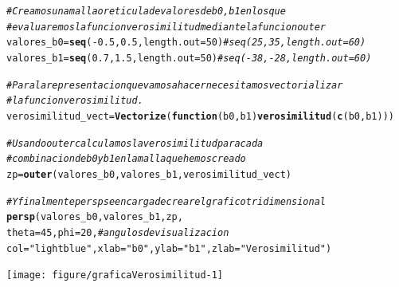 \documentclass[10pt,a4paper]{article}\usepackage[]{graphicx}\usepackage[]{color}
\makeatletter
\newcommand{\hlnum}[1]{\textcolor[rgb]{0.686,0.059,0.569}{#1}}%
\newcommand{\hlstr}[1]{\textcolor[rgb]{0.192,0.494,0.8}{#1}}%
\newcommand{\hlcom}[1]{\textcolor[rgb]{0.678,0.584,0.686}{\textit{#1}}}%
\newcommand{\hlopt}[1]{\textcolor[rgb]{0,0,0}{#1}}%
\newcommand{\hlstd}[1]{\textcolor[rgb]{0.345,0.345,0.345}{#1}}%
\newcommand{\hlkwa}[1]{\textcolor[rgb]{0.161,0.373,0.58}{\textbf{#1}}}%
\newcommand{\hlkwb}[1]{\textcolor[rgb]{0.69,0.353,0.396}{#1}}%
\newcommand{\hlkwc}[1]{\textcolor[rgb]{0.333,0.667,0.333}{#1}}%
\newcommand{\hlkwd}[1]{\textcolor[rgb]{0.737,0.353,0.396}{\textbf{#1}}}%
\newenvironment{kframe}{%
 \def\at@end@of@kframe{}%
 \ifinner\ifhmode%
  \def\at@end@of@kframe{\end{minipage}}%
  \begin{minipage}{\columnwidth}%
 \fi\fi%
 \def\FrameCommand##1{\hskip\@totalleftmargin \hskip-\fboxsep
 \colorbox{shadecolor}{##1}\hskip-\fboxsep
     \hskip-\linewidth \hskip-\@totalleftmargin \hskip\columnwidth}%
 \MakeFramed {\advance\hsize-\width
   \@totalleftmargin\z@ \linewidth\hsize
   \@setminipage}}%
 {\par\unskip\endMakeFramed%
 \at@end@of@kframe}
\newenvironment{knitrout}{}{} %
\makeatother
\begin{document}
\begin{knitrout}
\color{fgcolor}\begin{kframe}
\begin{alltt}
\hlcom{# Creamos una malla o reticula de valores de b0, b1 en los que}
\hlcom{# evaluaremos la funcion verosimilitud mediante la funcion outer}
\hlstd{valores_b0} \hlkwb{=} \hlkwd{seq}\hlstd{(}\hlopt{-}\hlnum{0.5}\hlstd{,} \hlnum{0.5}\hlstd{,} \hlkwc{length.out} \hlstd{=} \hlnum{50}\hlstd{)}\hlcom{#seq(25, 35, length.out = 60)}
\hlstd{valores_b1} \hlkwb{=} \hlkwd{seq}\hlstd{(}\hlnum{0.7}\hlstd{,} \hlnum{1.5}\hlstd{,} \hlkwc{length.out} \hlstd{=} \hlnum{50}\hlstd{)}\hlcom{#seq(-38, -28, length.out = 60)}

\hlcom{# Para la representacion que vamos a hacer necesitamos vectorializar}
\hlcom{# la funcion verosimilitud.}
\hlstd{verosimilitud_vect} \hlkwb{=} \hlkwd{Vectorize}\hlstd{(}\hlkwa{function}\hlstd{(}\hlkwc{b0}\hlstd{,} \hlkwc{b1}\hlstd{)}\hlkwd{verosimilitud}\hlstd{(}\hlkwd{c}\hlstd{(b0, b1)))}

\hlcom{# Usando outer calculamos la verosimilitud para cada}
\hlcom{# combinacion de b0 y b1 en la malla que hemos creado}
\hlstd{zp} \hlkwb{=} \hlkwd{outer}\hlstd{(valores_b0, valores_b1, verosimilitud_vect)}

\hlcom{# Y finalmente persp se encarga de crear el grafico tridimensional}
\hlkwd{persp}\hlstd{(valores_b0, valores_b1, zp,}
      \hlkwc{theta}\hlstd{=}\hlnum{45}\hlstd{,} \hlkwc{phi}\hlstd{=}\hlnum{20}\hlstd{,} \hlcom{# angulos de visualizacion}
      \hlkwc{col}\hlstd{=}\hlstr{"lightblue"}\hlstd{,} \hlkwc{xlab}\hlstd{=}\hlstr{"b0"}\hlstd{,} \hlkwc{ylab}\hlstd{=}\hlstr{"b1"}\hlstd{,} \hlkwc{zlab}\hlstd{=}\hlstr{"Verosimilitud"}\hlstd{)}
\end{alltt}
\end{kframe}

{\centering \texttt{[image: figure/graficaVerosimilitud-1]} 

}



\end{knitrout}
\end{document}
